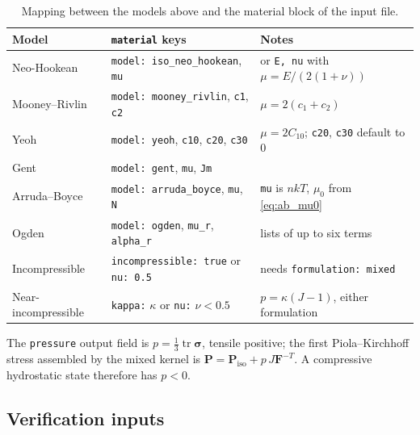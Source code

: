\documentclass[11pt]{article}
\newcommand{\tr}{\operatorname{tr}}
\newcommand{\bsig}{\bm{\sigma}}
\newcommand{\bP}{\bm{P}}
\newcommand{\bF}{\bm{F}}
\newcommand{\code}[1]{{\frenchspacing\texttt{#1}}}
\begin{document}
\begin{table}[htbp]
\centering
\small
\begin{tabular}{@{}l l >{\raggedright\arraybackslash}p{4.4cm}@{}}
\toprule
Model & \code{material} keys & Notes \\
\midrule
Neo-Hookean & \code{model: iso\_neo\_hookean}, \code{mu} & or \code{E, nu} with $\mu = E/(2(1+\nu))$ \\
Mooney--Rivlin & \code{model: mooney\_rivlin}, \code{c1}, \code{c2} & $\mu = 2(c_1 + c_2)$ \\
Yeoh & \code{model: yeoh}, \code{c10}, \code{c20}, \code{c30} & $\mu = 2C_{10}$; \code{c20}, \code{c30} default to 0 \\
Gent & \code{model: gent}, \code{mu}, \code{Jm} & \\
Arruda--Boyce & \code{model: arruda\_boyce}, \code{mu}, \code{N} & \code{mu} is $nkT$, $\mu_0$ from \eqref{eq:ab_mu0} \\
Ogden & \code{model: ogden}, \code{mu\_r}, \code{alpha\_r} & lists of up to six terms \\
Incompressible & \code{incompressible: true} or \code{nu: 0.5} & needs \code{formulation: mixed} \\
Near-incompressible & \code{kappa:} $\kappa$ or \code{nu:} $\nu < 0.5$ & $p = \kappa(J-1)$, either formulation \\
\bottomrule
\end{tabular}
\caption{Mapping between the models above and the material block of the input file.}
\end{table}

\noindent
The \code{pressure} output field is $p = \tfrac13\tr\bsig$, tensile
positive; the first Piola--Kirchhoff stress assembled by the mixed kernel is
$\bP = \bP_{\mathrm{iso}} + p\,J\bF^{-T}$.  A compressive hydrostatic state
therefore has $p < 0$.

\subsection{Verification inputs}
\label{sec:verification}
\end{document}
